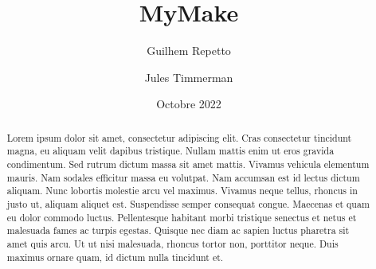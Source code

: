 \documentclass[11pt]{article}
\title{MyMake}
\date{Octobre 2022}
\author{Guilhem Repetto \and Jules Timmerman}
\begin{document}
\maketitle

\begin{abstract}
 Lorem ipsum dolor sit amet, consectetur adipiscing elit. Cras consectetur tincidunt magna, eu aliquam velit dapibus tristique. Nullam mattis enim ut eros gravida condimentum. Sed rutrum dictum massa sit amet mattis. Vivamus vehicula elementum mauris. Nam sodales efficitur massa eu volutpat. Nam accumsan est id lectus dictum aliquam. Nunc lobortis molestie arcu vel maximus. Vivamus neque tellus, rhoncus in justo ut, aliquam aliquet est. Suspendisse semper consequat congue. Maecenas et quam eu dolor commodo luctus. Pellentesque habitant morbi tristique senectus et netus et malesuada fames ac turpis egestas. Quisque nec diam ac sapien luctus pharetra sit amet quis arcu. Ut ut nisi malesuada, rhoncus tortor non, porttitor neque. Duis maximus ornare quam, id dictum nulla tincidunt et.
\end{abstract}
\end{document}
